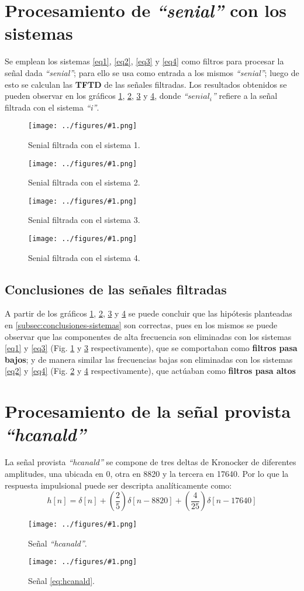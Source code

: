 \documentclass[letterpaper, 10 pt, conference]{ieeeconf}  %
\newcommand{\image}[2] {
  \begin{figure}[H]
    \centering
    \texttt{[image: ../figures/\#1.png]}
    \caption{#2}
    \label{fig:#1}
  \end{figure}
}
\begin{document}
\section{Procesamiento de \textit{``senial''} con los sistemas}
Se emplean los sistemas \ref{eq1}, \ref{eq2}, \ref{eq3} y \ref{eq4} como filtros para procesar la se\~nal dada \textit{``senial''}; para ello se usa como entrada a los mismos \textit{``senial''}; luego de esto se calculan las \textbf{TFTD} de las se\~nales filtradas. Los resultados obtenidos se pueden observar en los gr\'aficos \ref{fig:senial_filtrada_1}, \ref{fig:senial_filtrada_2}, \ref{fig:senial_filtrada_3} y \ref{fig:senial_filtrada_4}, donde \textit{``$senial_i$''} refiere a la señal  filtrada con el sistema \textit{``i''}.
\image{senial_filtrada_1}{Senial filtrada con el sistema 1.}
\image{senial_filtrada_2}{Senial filtrada con el sistema 2.}
\image{senial_filtrada_3}{Senial filtrada con el sistema 3.}
\image{senial_filtrada_4}{Senial filtrada con el sistema 4.}
\subsection{Conclusiones de las se\~nales filtradas}
A partir de los gr\'aficos \ref{fig:senial_filtrada_1}, \ref{fig:senial_filtrada_2}, \ref{fig:senial_filtrada_3} y \ref{fig:senial_filtrada_4} se puede concluir que las hip\'otesis planteadas en \ref{subsec:conclusiones-sistemas} son correctas, pues en los mismos se puede observar que las componentes de alta frecuencia son eliminadas con los sistemas \ref{eq1} y \ref{eq3} (Fig. \ref{fig:senial_filtrada_1} y \ref{fig:senial_filtrada_3} respectivamente), que se comportaban como \textbf{filtros pasa bajos}; y de manera similar las frecuencias bajas son eliminadas con los sistemas \ref{eq2} y \ref{eq4} (Fig. \ref{fig:senial_filtrada_2} y \ref{fig:senial_filtrada_4} respectivamente), que act\'uaban como \textbf{filtros pasa altos}

\section{Procesamiento de la se\~nal provista \textit{``hcanald''}}
La se\~nal provista \textit{``hcanald''} se compone de tres deltas de Kronocker de diferentes amplitudes, una ubicada en 0, otra en 8820 y la tercera en 17640. Por lo que la respuesta impulsional puede ser descripta anal\'iticamente como:
\begin{equation} \label{eq:hcanald}
  h[n] = \delta[n] + (\frac{2}{5})\delta[n-8820] + (\frac{4}{25})\delta[n-17640]
\end{equation}
\image{hcanald}{Se\~nal \textit{``hcanald''}.}
\image{hcanald_analitica}{Se\~nal \ref{eq:hcanald}.}
\end{document}
